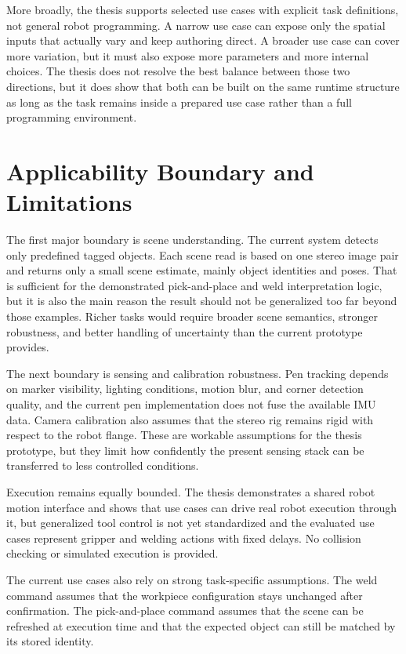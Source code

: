 More broadly, the thesis supports selected use cases with explicit task definitions, not general robot programming. A narrow use case can expose only the spatial inputs that actually vary and keep authoring direct. A broader use case can cover more variation, but it must also expose more parameters and more internal choices. The thesis does not resolve the best balance between those two directions, but it does show that both can be built on the same runtime structure as long as the task remains inside a prepared use case rather than a full programming environment.

\section{Applicability Boundary and Limitations}

The first major boundary is scene understanding. The current system detects only predefined tagged objects. Each scene read is based on one stereo image pair and returns only a small scene estimate, mainly object identities and poses. That is sufficient for the demonstrated pick-and-place and weld interpretation logic, but it is also the main reason the result should not be generalized too far beyond those examples. Richer tasks would require broader scene semantics, stronger robustness, and better handling of uncertainty than the current prototype provides.

The next boundary is sensing and calibration robustness. Pen tracking depends on marker visibility, lighting conditions, motion blur, and corner detection quality, and the current pen implementation does not fuse the available IMU data. Camera calibration also assumes that the stereo rig remains rigid with respect to the robot flange. These are workable assumptions for the thesis prototype, but they limit how confidently the present sensing stack can be transferred to less controlled conditions.

Execution remains equally bounded. The thesis demonstrates a shared robot motion interface and shows that use cases can drive real robot execution through it, but generalized tool control is not yet standardized and the evaluated use cases represent gripper and welding actions with fixed delays. No collision checking or simulated execution is provided.

The current use cases also rely on strong task-specific assumptions. The weld command assumes that the workpiece configuration stays unchanged after confirmation. The pick-and-place command assumes that the scene can be refreshed at execution time and that the expected object can still be matched by its stored identity.

